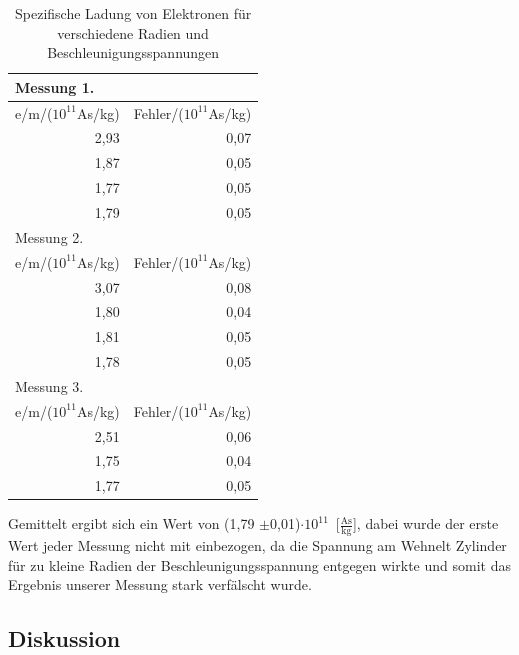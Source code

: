 \documentclass[12pt,a4paper]{article}
\begin{document}
\begin{table}[H]
\caption{Spezifische Ladung von Elektronen für verschiedene Radien und Beschleunigungsspannungen}
\begin{center}
\begin{tabular}{|r|r|}
\hline
\multicolumn{1}{|l|}{Messung 1.} & \multicolumn{1}{l|}{} \\ \hline
\multicolumn{1}{|l|}{e/m/($10^{11}$As/kg)} & \multicolumn{1}{l|}{Fehler/($10^{11}$As/kg)} \\ \hline
2,93 & 0,07 \\ \hline
1,87 & 0,05 \\ \hline
1,77 & 0,05 \\ \hline
1,79 & 0,05 \\ \hline \hline
\multicolumn{1}{|l|}{Messung 2.} & \multicolumn{1}{l|}{} \\ \hline
\multicolumn{1}{|l|}{e/m/($10^{11}$As/kg)} & \multicolumn{1}{l|}{Fehler/($10^{11}$As/kg)} \\ \hline
3,07 & 0,08 \\ \hline
1,80 & 0,04 \\ \hline
1,81 & 0,05 \\ \hline
1,78 & 0,05 \\ \hline \hline
\multicolumn{1}{|l|}{Messung 3.} & \multicolumn{1}{l|}{} \\ \hline
\multicolumn{1}{|l|}{e/m/($10^{11}$As/kg)} & \multicolumn{1}{l|}{Fehler/($10^{11}$As/kg)} \\ \hline
2,51 & 0,06 \\ \hline
1,75 & 0,04 \\ \hline
1,77 & 0,05 \\ \hline
\end{tabular}
\end{center}
\label{tab:aus_e/m}
\end{table}

Gemittelt ergibt sich ein Wert von \unit{(1,79 $\pm$0,01)$\cdot 10^{11}$}[$\frac{\text{As}}{\text{kg}}$], dabei wurde der erste Wert jeder Messung nicht mit einbezogen, da die Spannung am Wehnelt Zylinder für zu kleine Radien der Beschleunigungsspannung entgegen wirkte und somit das Ergebnis unserer Messung stark verfälscht wurde.
\newpage
\subsection{Diskussion}
\end{document}
